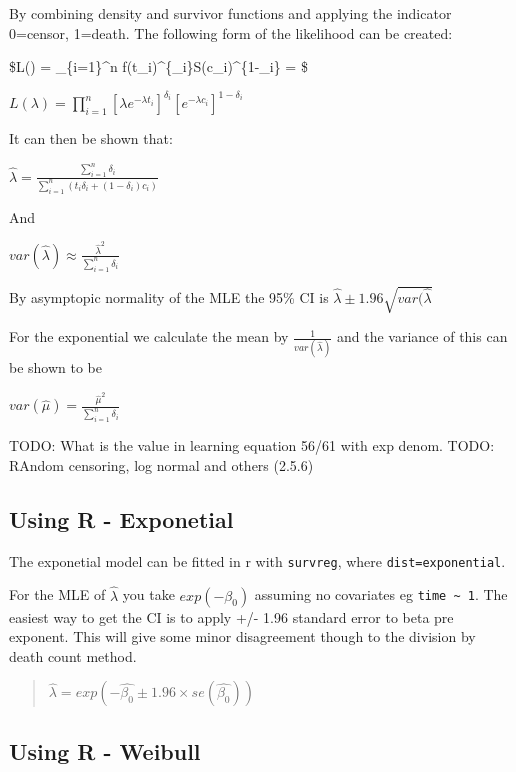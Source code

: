 \documentclass[
  letterpaper,
  DIV=11,
  numbers=noendperiod]{scrreprt}
\begin{document}
By combining density and survivor functions and applying the indicator
0=censor, 1=death. The following form of the likelihood can be created:

\$L(\lambda) = \prod\_\{i=1\}\^{}n
f(t\_i)\^{}\{\delta\_i\}S(c\_i)\^{}\{1-\delta\_i\} = \$

\(L(\lambda) = \prod_{i=1}^n [\lambda e^{-\lambda t_i}]^{\delta_i}[e^{-\lambda c_i}]^{1-\delta_i}\)

It can then be shown that:

\(\hat{\lambda} = \frac{\sum^n_{i=1} \delta_i}{\sum^n_{i=1}(t_i\delta_i +(1-\delta_i)c_i)}\)

And

\(var(\hat{\lambda}) \approx \frac{\hat{\lambda}^2}{\sum^n_{i=1} \delta_i}\)

By asymptopic normality of the MLE the 95\% CI is
\(\hat{\lambda}\pm 1.96\sqrt{var(\hat{\lambda}}\)

For the exponential we calculate the mean by
\(\frac{1}{var(\hat{\lambda})}\) and the variance of this can be shown
to be

\(var(\hat{\mu}) = \frac{\hat{\mu}^2}{\sum_{i=1}^n \delta_i}\)

TODO: What is the value in learning equation 56/61 with exp denom. TODO:
RAndom censoring, log normal and others (2.5.6)

\hypertarget{using-r---exponetial}{%
\subsection{Using R - Exponetial}\label{using-r---exponetial}}

The exponetial model can be fitted in r with \texttt{survreg}, where
\texttt{dist=\textquotesingle{}exponential\textquotesingle{}}.

For the MLE of \(\hat{\lambda}\) you take \(exp(-\beta_0)\) assuming no
covariates eg \texttt{time\ \textasciitilde{}\ 1}. The easiest way to
get the CI is to apply +/- 1.96 standard error to beta pre exponent.
This will give some minor disagreement though to the division by death
count method.

\begin{quote}
\(\hat{\lambda} = exp(-\hat{\beta_0} \pm 1.96\times se(\hat{\beta_0}))\)
\end{quote}

\hypertarget{using-r---weibull}{%
\subsection{Using R - Weibull}\label{using-r---weibull}}
\end{document}
